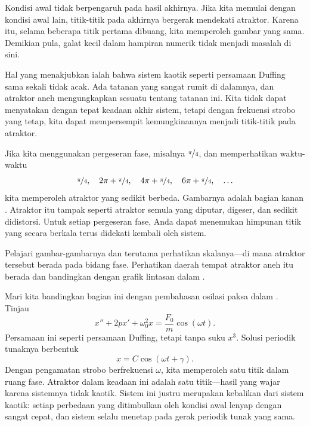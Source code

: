 Kondisi awal tidak berpengaruh pada hasil akhirnya.  Jika kita memulai dengan
kondisi awal lain, titik-titik pada akhirnya bergerak mendekati atraktor.
Karena itu, selama beberapa titik pertama dibuang, kita memperoleh gambar yang
sama.  Demikian pula, galat kecil dalam hampiran numerik tidak menjadi masalah
di sini.

Hal yang menakjubkan ialah bahwa sistem kaotik seperti persamaan Duffing sama
sekali tidak acak.  Ada tatanan yang sangat rumit di dalamnya, dan atraktor
aneh mengungkapkan sesuatu tentang tatanan ini.  Kita tidak dapat menyatakan
dengan tepat keadaan akhir sistem, tetapi dengan frekuensi strobo yang tetap,
kita dapat mempersempit kemungkinannya menjadi titik-titik pada atraktor.

Jika kita menggunakan pergeseran fase, misalnya $\nicefrac{\pi}{4}$, dan
memperhatikan waktu-waktu
\begin{equation*}
\nicefrac{\pi}{4}, \quad
2\pi+\nicefrac{\pi}{4}, \quad
4\pi+\nicefrac{\pi}{4}, \quad
6\pi+\nicefrac{\pi}{4}, \quad
\ldots
\end{equation*}
kita memperoleh atraktor yang sedikit berbeda.  Gambarnya adalah bagian kanan
.  Atraktor itu tampak seperti atraktor semula yang
diputar, digeser, dan sedikit didistorsi.  Untuk setiap pergeseran fase, Anda
dapat menemukan himpunan titik yang secara berkala terus didekati kembali oleh
sistem.

Pelajari gambar-gambarnya dan terutama perhatikan skalanya---di mana atraktor
tersebut berada pada bidang fase.  Perhatikan daerah tempat atraktor aneh itu
berada dan bandingkan dengan grafik lintasan dalam
.

Mari kita bandingkan bagian ini dengan pembahasan osilasi paksa dalam
.  Tinjau
\begin{equation*}
x''+2p x' + \omega_0^2 x = \frac{F_0}{m} \cos (\omega t) .
\end{equation*}
Persamaan ini seperti persamaan Duffing, tetapi tanpa suku $x^3$.
Solusi periodik tunaknya berbentuk
\begin{equation*}
x = C \cos (\omega t + \gamma) .
\end{equation*}
Dengan pengamatan strobo berfrekuensi $\omega$, kita memperoleh satu titik
dalam ruang fase.  Atraktor dalam keadaan ini adalah satu titik---hasil yang
wajar karena sistemnya tidak kaotik.  Sistem ini justru merupakan kebalikan
dari sistem kaotik: setiap perbedaan yang ditimbulkan oleh kondisi awal lenyap
dengan sangat cepat, dan sistem selalu menetap pada gerak periodik tunak yang
sama.

